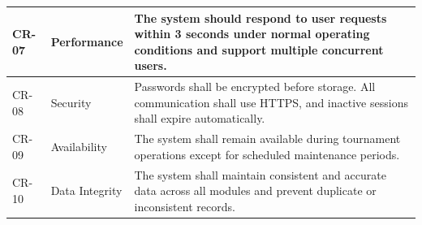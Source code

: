 \begin{longtable}{|p{2cm}|p{4cm}|p{9cm}|}
CR-07 &
Performance &
The system should respond to user requests within 3 seconds under normal operating conditions and support multiple concurrent users. \\ \hline

CR-08 &
Security &
Passwords shall be encrypted before storage. All communication shall use HTTPS, and inactive sessions shall expire automatically. \\ \hline

CR-09 &
Availability &
The system shall remain available during tournament operations except for scheduled maintenance periods. \\ \hline

CR-10 &
Data Integrity &
The system shall maintain consistent and accurate data across all modules and prevent duplicate or inconsistent records. \\ \hline

\end{longtable}